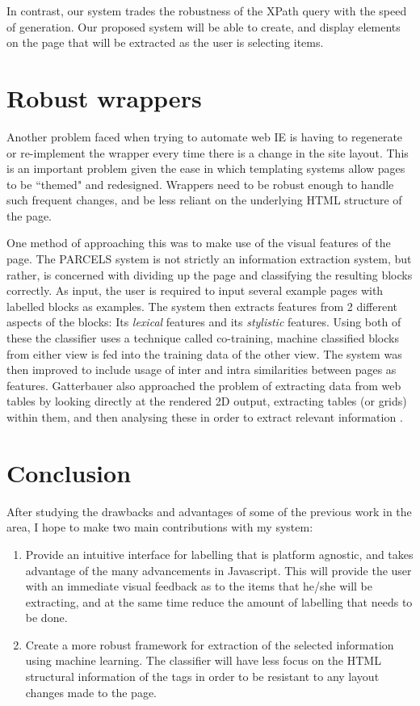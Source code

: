 In contrast, our system trades the robustness of the XPath
query with the speed of generation. Our proposed system will be able to create, and display
elements on the page that will be extracted as the user is selecting items.

\section{Robust wrappers}
Another problem faced when trying to automate web IE is having to regenerate or re-implement
the wrapper every time there is a change in the site layout. This is an important problem given
the ease in which templating systems allow pages to be ``themed" and redesigned. Wrappers need
to be robust enough to handle such frequent changes, and be less reliant on the underlying HTML
structure of the page.
	
One method of approaching this was to make use of the visual features of the page. The PARCELS \cite{Lee2004}
system is not strictly an information extraction system, but rather, is concerned with dividing
up the page and classifying the resulting blocks correctly. As input, the user is required to
input several example pages with labelled blocks as examples. The system then extracts features
from 2 different aspects of the blocks: Its \textit{lexical} features and its
\textit{stylistic} features. Using both of these the classifier uses a technique called
co-training, machine classified blocks from either view is fed into the training data of the
other view. The system was then improved to include usage of inter and intra
similarities between pages as features\cite{AikMiang2005}. Gatterbauer also approached the
problem of extracting data from web tables by looking directly at the rendered 2D output,
extracting tables (or grids) within them, and then analysing these in order to extract relevant
information \cite{Gatterbauer2007}.

\section{Conclusion}


After studying the drawbacks and advantages of some of the previous work in the area, I hope to
make two main contributions with my system:
\begin{enumerate}
	\item Provide an intuitive interface for labelling that is platform agnostic, and takes advantage of the many advancements in Javascript. This will provide the user with an immediate visual feedback as to the items that he/she will be extracting, and at the same time reduce the amount of labelling that needs to be done.
	\item Create a more robust framework for extraction of the selected information using machine learning. The classifier will have less focus on the HTML structural information of the tags in order to be resistant to any layout changes made to the page.
\end{enumerate}

